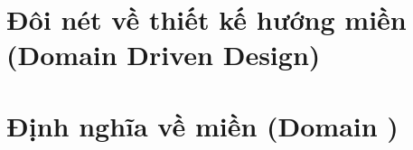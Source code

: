 \section{Đôi nét  về thiết kế hướng miền (Domain Driven Design)}





\section{Định nghĩa về miền (Domain    )}






